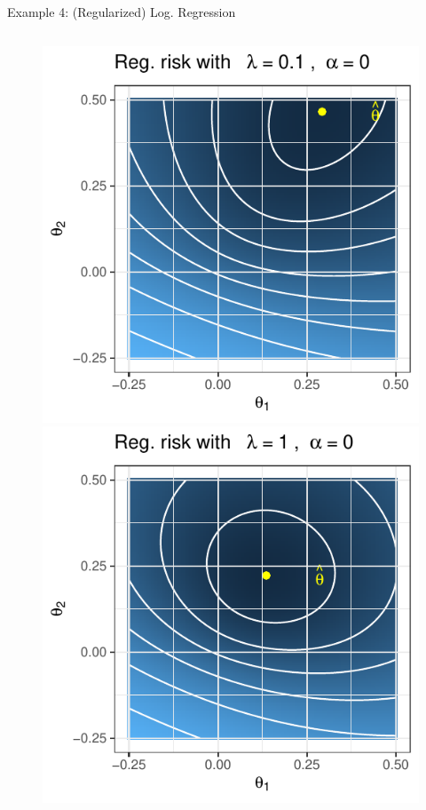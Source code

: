 \documentclass[11pt,compress,t,notes=noshow, xcolor=table]{beamer}
\begin{document}
\begin{vbframe}{Example 4: (Regularized) Log. Regression}
\begin{columns}
\begin{column}{.3\textwidth}
\begin{figure}
	\includegraphics{figure_man/logreg-0-0.1.pdf}\\
	\includegraphics{figure_man/logreg-0-1.pdf} 

\end{figure}
\end{column}
\end{columns}
\end{vbframe}
\end{document}

